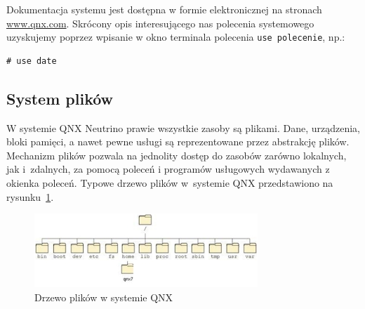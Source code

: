 \begin{example}\label{ex:prostakomenda9}

Dokumentacja systemu jest dostępna w formie elektronicznej na stronach \href{www.qnx.com}{www.qnx.com}. Skrócony opis interesującego nas polecenia systemowego uzyskujemy poprzez wpisanie w okno terminala polecenia \lstinline[style=MyBashStyle]{use polecenie}, np.:

\begin{lstlisting}[style=MyBashStyle]
# use date
\end{lstlisting}
\end{example}

\subsection{System plików}

W systemie QNX Neutrino prawie wszystkie zasoby są plikami. Dane, urządzenia, bloki pamięci, a nawet pewne usługi są reprezentowane przez abstrakcję plików. Mechanizm plików pozwala na jednolity dostęp do zasobów zarówno lokalnych, jak i~zdalnych, za pomocą poleceń i programów usługowych wydawanych z okienka poleceń. Typowe drzewo plików w~systemie QNX przedstawiono na rysunku~\ref{fig:drzewo}.

\begin{figure}[!h]
\centering
\includegraphics[width=0.75\textwidth]{img/systemplikow}
\caption{Drzewo plików w systemie QNX}
\label{fig:drzewo}
\end{figure}

